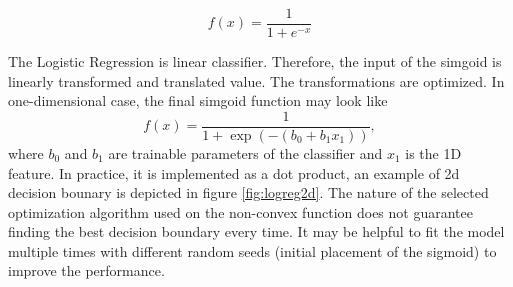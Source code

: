 \documentclass{article}
\begin{document}
\begin{equation}
    f(x) = \frac{1}{1 + e^{-x}}
    \label{eq:sigmoid}
\end{equation}

The Logistic Regression is linear classifier. Therefore, the input of the simgoid is linearly transformed and translated value. The transformations are optimized. In one-dimensional case, the final simgoid function may look like 
$$
    f(x) = \frac{1}{1 + \exp{\left(-(b_0 + b_1 x_1)\right)}},
$$
where $b_0$ and $b_1$ are trainable parameters of the classifier and $x_1$ is the 1D feature.
In practice, it is implemented as a dot product, an example of 2d decision bounary is depicted in figure \ref{fig:logreg2d}.
The nature of the selected optimization algorithm used on the non-convex function does not guarantee finding the best decision boundary every time. It may be helpful to fit the model multiple times with different random seeds (initial placement of the sigmoid) to improve the performance.
\end{document}
